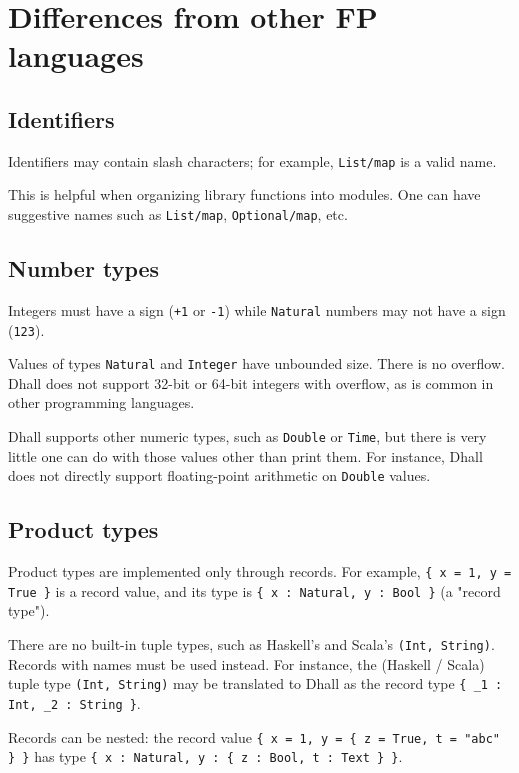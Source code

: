 \section{Differences from other FP languages}


\subsection{Identifiers}


Identifiers may contain slash characters; for example, \lstinline!List/map! is a valid name.


This is helpful when organizing library functions into modules.
One can have suggestive names such as \lstinline!List/map!, \lstinline!Optional/map!, etc.


\subsection{Number types}


Integers must have a sign (\lstinline!+1! or \lstinline!-1!) while \lstinline!Natural! numbers may not have a sign (\lstinline!123!).


Values of types \lstinline!Natural! and \lstinline!Integer! have unbounded size.
There is no overflow.
Dhall does not support 32-bit or 64-bit integers with overflow, as is common in other programming languages.


Dhall supports other numeric types, such as \lstinline!Double! or \lstinline!Time!, but there is very little one can do with those values other than print them.
For instance, Dhall does not directly support floating-point arithmetic on \lstinline!Double! values.


\subsection{Product types}


Product types are implemented only through records.
For example, \lstinline!{ x = 1, y = True }! is a record value, and its type is \lstinline!{ x : Natural, y : Bool }! (a "record type").


There are no built-in tuple types, such as Haskell's and Scala's \lstinline!(Int, String)!.
Records with names must be used instead.
For instance, the (Haskell / Scala) tuple type \lstinline!(Int, String)! may be translated to Dhall as the record type \lstinline!{ _1 : Int, _2 : String }!.


Records can be nested: the record value \lstinline!{ x = 1, y = { z = True, t = "abc" } }! has type \lstinline!{ x : Natural, y : { z : Bool, t : Text } }!.


